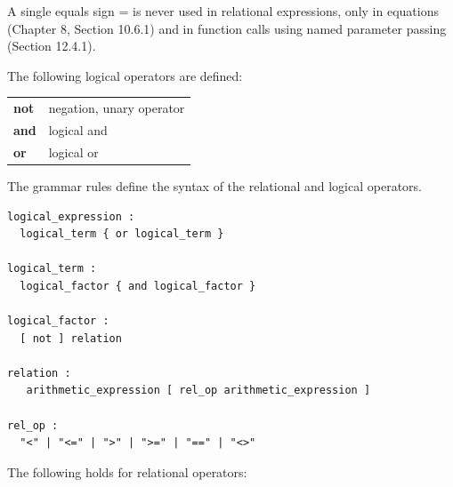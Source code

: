 \documentclass[10pt,a4paper]{report}
\begin{document}
A single equals sign = is never used in relational expressions, only in
equations (Chapter 8, Section 10.6.1) and in function calls using
named parameter passing (Section 12.4.1).

The following logical operators are defined:

\begin{longtable}[c]{@{}ll@{}}

\textbf{not} & negation, unary operator\tabularnewline
\textbf{and} & logical and\tabularnewline
\textbf{or} & logical or\tabularnewline

\end{longtable}

The grammar rules define the syntax of the relational and logical
operators.
\begin{lstlisting}[language=grammar]
logical_expression : 
  logical_term { or logical_term }
  
logical_term : 
  logical_factor { and logical_factor }
  
logical_factor : 
  [ not ] relation

relation : 
   arithmetic_expression [ rel_op arithmetic_expression ]

rel_op : 
  "<" | "<=" | ">" | ">=" | "==" | "<>"
\end{lstlisting}

The following holds for relational operators:
\end{document}
